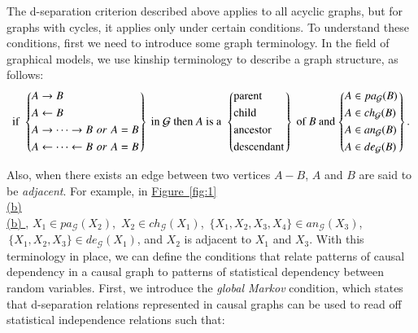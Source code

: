 \documentclass[twoside, 11pt]{article}
\newcommand*{\figref}[2][]{%
  \hyperref[{fig:#2}]{%
    Figure~\ref*{fig:#2}%
    \ifx\\#1\\%
    \else
      #1%
    \fi
  }%
}
\begin{document}
 
The d-separation criterion described above applies to all acyclic graphs, but for graphs with cycles, it applies only under certain conditions.
To understand these conditions, first we need to introduce some graph terminology. In the field of graphical models, we use kinship terminology to describe a graph structure, as follows:
\begin{equation*}
\text{if }
  \begin{rcases}
    \begin{dcases}
      A \rightarrow B \\
      A \leftarrow B \\
      A \rightarrow \cdots \rightarrow B \,\,or \,\,A = B \\
      A \leftarrow \cdots \leftarrow B \,\,or \,\,A = B
\end{dcases}
  \end{rcases}
  \text{ in } \mathcal{G} \text{ then } A \text{ is a }
  \begin{rcases}
    \begin{dcases}
      \text{parent} \\
      \text{child} \\
      \text{ancestor} \\
      \text{descendant}
\end{dcases}
  \end{rcases}
\text{ of } B \text{ and}
  \begin{rcases}
    \begin{dcases}
      A \in pa_{\mathcal{G}}(B) \\
      A \in ch_{\mathcal{G}}(B) \\
      A \in an_{\mathcal{G}}(B) \\
      A \in de_{\mathcal{G}}(B)
\end{dcases}
  \end{rcases}
\text{.}
\end{equation*}

\noindent Also, when there exists an edge between two vertices $A - B$, $A$ and $B$ are said to be \textit{adjacent}. For example, in \figref[(b)]{1}, $X_1 \in pa_{\mathcal{G}} (X_2)$, $\,X_2 \in ch_{\mathcal{G}} (X_1)$, $\,\{X_1, X_2, X_3, X_4\} \in an_{\mathcal{G}}(X_3)$, $\,\{X_1, X_2, X_3\} \in de_{\mathcal{G}} (X_1)$, and $X_2$ is adjacent to $X_1$ and $X_3$. With this terminology in place, we can define the conditions that relate patterns of causal dependency in a causal graph to patterns of statistical dependency between random variables. First, we introduce the \textit{global Markov} condition, which states that d-separation relations represented in causal graphs can be used to read off statistical independence relations such that:
\end{document}
